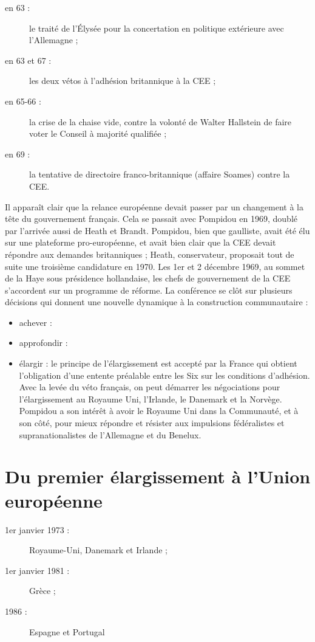 \documentclass{report}%
\begin{document}
	\begin{description}
		\item [en 63 :] le traité de l'Élysée pour la concertation en politique extérieure avec l’Allemagne ;
		\item [en 63 et 67 :] les deux vétos à l’adhésion britannique à la CEE ;
		\item [en 65-66 :] la crise de la chaise vide, contre la volonté de Walter Hallstein de faire voter le Conseil à majorité qualifiée ;
		\item [en 69 :] la tentative de directoire franco-britannique (affaire Soames) contre la CEE.
	\end{description}
Il apparaît clair que la relance européenne devait passer par un changement à la tête du gouvernement français. Cela se passait avec Pompidou en 1969, doublé par l’arrivée aussi de Heath et Brandt. Pompidou, bien que gaulliste, avait été élu sur une plateforme pro-européenne, et avait bien clair que la CEE devait répondre aux demandes britanniques ; Heath, conservateur, proposait tout de suite une troisième candidature en 1970. Les 1er et 2 décembre 1969, au sommet de la Haye sous présidence hollandaise, les chefs de gouvernement de la CEE s’accordent sur un programme de réforme. La conférence se clôt sur plusieurs décisions qui donnent une nouvelle dynamique à la construction communautaire :
	\begin{itemize}
		\item achever :
		\item approfondir :
		\item élargir : le principe de l'élargissement est accepté par la France qui obtient l'obligation d'une entente préalable entre les Six sur les conditions d'adhésion. Avec la levée du véto français, on peut démarrer les négociations pour l’élargissement au Royaume Uni, l’Irlande, le Danemark et la Norvège. Pompidou a son intérêt à avoir le Royaume Uni dans la Communauté, et à son côté, pour mieux répondre et résister aux impulsions fédéralistes et supranationalistes de l'Allemagne et du Benelux.
	\end{itemize}
\section{Du premier élargissement à l'Union européenne}
	\begin{description}
		\item [1er janvier 1973 :] Royaume-Uni, Danemark et Irlande ;
		\item [1er janvier 1981 :] Grèce ;
		\item [1986 :] Espagne et Portugal
	\end{description}
\end{document}
